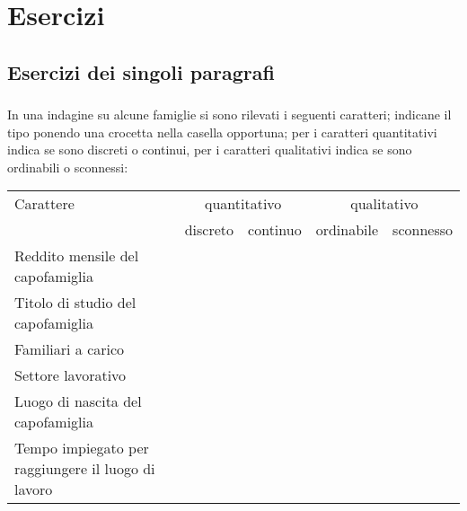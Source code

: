 
\section{Esercizi}

\subsection{Esercizi dei singoli paragrafi}

\subsubsection*{}

\begin{esercizio}
\label{ese:A.1}
In una indagine su alcune famiglie si sono rilevati i seguenti caratteri; 
indicane il tipo ponendo una crocetta nella casella
opportuna; per i caratteri quantitativi indica se sono discreti o continui, 
per i caratteri qualitativi indica se sono ordinabili o sconnessi:
\begin{center}
 \begin{tabularx}{.9\textwidth}{Xcccc}
\toprule
Carattere & \multicolumn{2}{c}{quantitativo} & 
\multicolumn{2}{c}{qualitativo}\\
 & discreto & continuo & ordinabile & sconnesso\\
\midrule
Reddito mensile del capofamiglia & & & & \\
Titolo di studio del capofamiglia & & & & \\
Familiari a carico & & & & \\
Settore lavorativo & & & & \\
Luogo di nascita del capofamiglia & & & & \\
Tempo impiegato per raggiungere il luogo di lavoro & & & & \\
\bottomrule
\end{tabularx}
\end{center}
\end{esercizio}

